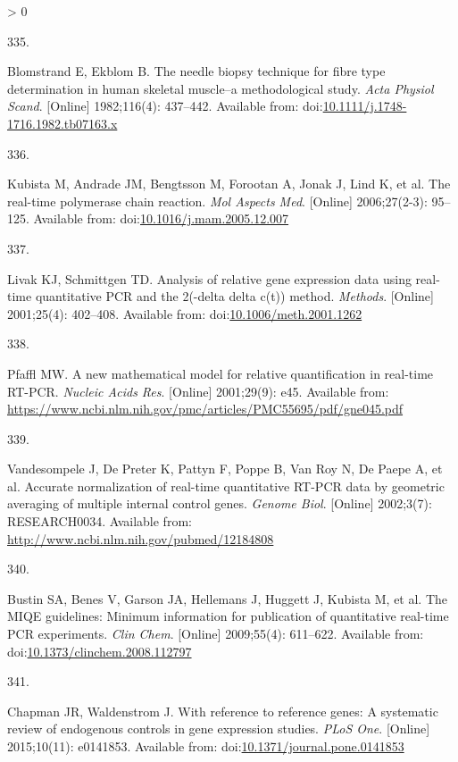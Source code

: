 \documentclass[twoside,10pt]{gihclass} %
\newlength{\cslhangindent}
\newlength{\csllabelwidth}
\newenvironment{CSLReferences}[3] %
 {%
  \setlength{\parindent}{0pt}
  \ifodd #1 \everypar{\setlength{\hangindent}{\cslhangindent}}\ignorespaces\fi
  \ifnum #2 > 0
  \setlength{\parskip}{#2\baselineskip}
  \fi
 }%
 {}
\newcommand{\CSLLeftMargin}[1]{\parbox[t]{\maxof{\widthof{#1}}{\csllabelwidth}}{#1}}
\newcommand{\CSLRightInline}[1]{\parbox[t]{\linewidth}{#1}}
\begin{document}
\begin{CSLReferences}{0}{0}
\leavevmode\hypertarget{ref-RN874}{}%
\CSLLeftMargin{335. }
\CSLRightInline{Blomstrand E, Ekblom B. The needle biopsy technique for fibre type determination in human skeletal muscle--a methodological study. \emph{Acta Physiol Scand}. {[}Online{]} 1982;116(4): 437--442. Available from: doi:\href{https://doi.org/10.1111/j.1748-1716.1982.tb07163.x}{10.1111/j.1748-1716.1982.tb07163.x}}

\leavevmode\hypertarget{ref-RN2099}{}%
\CSLLeftMargin{336. }
\CSLRightInline{Kubista M, Andrade JM, Bengtsson M, Forootan A, Jonak J, Lind K, et al. The real-time polymerase chain reaction. \emph{Mol Aspects Med}. {[}Online{]} 2006;27(2-3): 95--125. Available from: doi:\href{https://doi.org/10.1016/j.mam.2005.12.007}{10.1016/j.mam.2005.12.007}}

\leavevmode\hypertarget{ref-RN2100}{}%
\CSLLeftMargin{337. }
\CSLRightInline{Livak KJ, Schmittgen TD. Analysis of relative gene expression data using real-time quantitative PCR and the 2(-delta delta c(t)) method. \emph{Methods}. {[}Online{]} 2001;25(4): 402--408. Available from: doi:\href{https://doi.org/10.1006/meth.2001.1262}{10.1006/meth.2001.1262}}

\leavevmode\hypertarget{ref-RN2101}{}%
\CSLLeftMargin{338. }
\CSLRightInline{Pfaffl MW. A new mathematical model for relative quantification in real-time RT-PCR. \emph{Nucleic Acids Res}. {[}Online{]} 2001;29(9): e45. Available from: \url{https://www.ncbi.nlm.nih.gov/pmc/articles/PMC55695/pdf/gne045.pdf}}

\leavevmode\hypertarget{ref-RN991}{}%
\CSLLeftMargin{339. }
\CSLRightInline{Vandesompele J, De Preter K, Pattyn F, Poppe B, Van Roy N, De Paepe A, et al. Accurate normalization of real-time quantitative RT-PCR data by geometric averaging of multiple internal control genes. \emph{Genome Biol}. {[}Online{]} 2002;3(7): RESEARCH0034. Available from: \url{http://www.ncbi.nlm.nih.gov/pubmed/12184808}}

\leavevmode\hypertarget{ref-RN1983}{}%
\CSLLeftMargin{340. }
\CSLRightInline{Bustin SA, Benes V, Garson JA, Hellemans J, Huggett J, Kubista M, et al. The MIQE guidelines: Minimum information for publication of quantitative real-time PCR experiments. \emph{Clin Chem}. {[}Online{]} 2009;55(4): 611--622. Available from: doi:\href{https://doi.org/10.1373/clinchem.2008.112797}{10.1373/clinchem.2008.112797}}

\leavevmode\hypertarget{ref-RN1985}{}%
\CSLLeftMargin{341. }
\CSLRightInline{Chapman JR, Waldenstrom J. With reference to reference genes: A systematic review of endogenous controls in gene expression studies. \emph{PLoS One}. {[}Online{]} 2015;10(11): e0141853. Available from: doi:\href{https://doi.org/10.1371/journal.pone.0141853}{10.1371/journal.pone.0141853}}


\end{CSLReferences}
\end{document}
